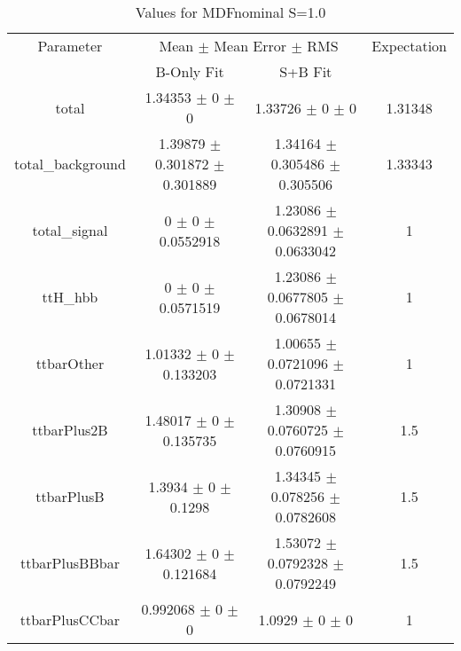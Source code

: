 \begin{table}
\centering
\caption{Values for MDFnominal S=1.0}
\begin{tabular}{cccc}
\toprule
Parameter & \multicolumn{2}{c}{Mean $\pm$ Mean Error $\pm$ RMS} & Expectation\\
 & B-Only Fit & S+B Fit & \\
\midrule
total & \num{1.34353} $\pm$ \num{0} $\pm$ \num{0} & \num{1.33726} $\pm$ \num{0} $\pm$ \num{0} & \num{1.31348}\\
total\_background & \num{1.39879} $\pm$ \num{0.301872} $\pm$ \num{0.301889} & \num{1.34164} $\pm$ \num{0.305486} $\pm$ \num{0.305506} & \num{1.33343}\\
total\_signal & \num{0} $\pm$ \num{0} $\pm$ \num{0.0552918} & \num{1.23086} $\pm$ \num{0.0632891} $\pm$ \num{0.0633042} & \num{1}\\
ttH\_hbb & \num{0} $\pm$ \num{0} $\pm$ \num{0.0571519} & \num{1.23086} $\pm$ \num{0.0677805} $\pm$ \num{0.0678014} & \num{1}\\
ttbarOther & \num{1.01332} $\pm$ \num{0} $\pm$ \num{0.133203} & \num{1.00655} $\pm$ \num{0.0721096} $\pm$ \num{0.0721331} & \num{1}\\
ttbarPlus2B & \num{1.48017} $\pm$ \num{0} $\pm$ \num{0.135735} & \num{1.30908} $\pm$ \num{0.0760725} $\pm$ \num{0.0760915} & \num{1.5}\\
ttbarPlusB & \num{1.3934} $\pm$ \num{0} $\pm$ \num{0.1298} & \num{1.34345} $\pm$ \num{0.078256} $\pm$ \num{0.0782608} & \num{1.5}\\
ttbarPlusBBbar & \num{1.64302} $\pm$ \num{0} $\pm$ \num{0.121684} & \num{1.53072} $\pm$ \num{0.0792328} $\pm$ \num{0.0792249} & \num{1.5}\\
ttbarPlusCCbar & \num{0.992068} $\pm$ \num{0} $\pm$ \num{0} & \num{1.0929} $\pm$ \num{0} $\pm$ \num{0} & \num{1}\\
\bottomrule
\end{tabular}
\end{table}